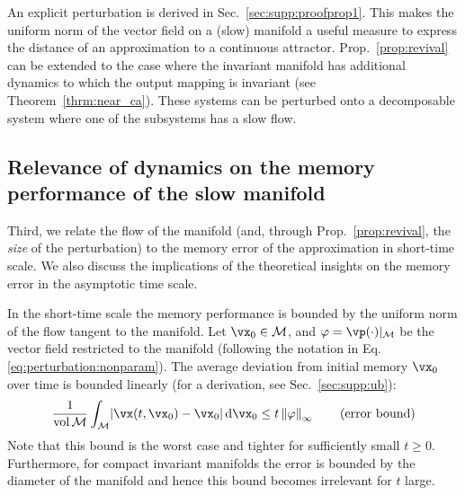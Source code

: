 \documentclass{article} %
\newcounter{ct}
\newcommand{\dm}[1]{\ensuremath{\mathrm{d}{#1}}} %
\newcommand{\manifold}{\mathcal{M}}
\newcommand{\uniformNorm}[1]{\left\|#1\right\|_\infty} %
\DeclarePairedDelimiter{\abs}{\lvert}{\rvert}
\theoremstyle{definition}
\theoremstyle{remark}
\begin{document}
\vspace{-.1cm}
An explicit perturbation is derived in Sec.~\ref{sec:supp:proofprop1}.
This makes the uniform norm of the vector field on a (slow) manifold a useful measure to express the distance of an approximation to a continuous attractor.
Prop.~\ref{prop:revival}  can be extended to the case where the invariant manifold has additional dynamics to which the output mapping is invariant (see Theorem~\ref{thrm:near_ca}).
These systems can be perturbed onto a decomposable system where one of the subsystems has a slow flow.

\subsection{Relevance of dynamics on the memory performance of the slow manifold}\label{sec:attractor_bif}

Third, we relate the flow of the manifold (and, through Prop.~\ref{prop:revival}, the \emph{size} of the perturbation) to the memory error of the approximation in short-time scale.
We also discuss the implications of the theoretical insights on the memory error in the asymptotic time scale.

In the short-time scale the memory performance is bounded by the uniform norm of the flow tangent to the manifold.
Let \(\vx_{0} \in \manifold\), and \(\varphi = \vp(\cdot)\vert_{\manifold}\) be the vector field restricted to the manifold (following the notation in Eq.\ref{eq:perturbation:nonparam}).
The average deviation from initial memory \(\vx_{0}\) over time is bounded linearly (for a derivation, see Sec.~\ref{sec:supp:ub}):
\begin{align}\label{eq:distance:ub}
\frac{1}{\operatorname{vol}\manifold}\int_{\manifold}
\abs{\vx(t, \vx_{0}) - \vx_{0}}\,
\dm{\vx_{0}}
\leq t\uniformNorm{\varphi}
\qquad
\text{(error bound)}
\end{align}
Note that this bound is the worst case and tighter for sufficiently small \(t \geq 0\).
Furthermore, for compact invariant manifolds the error is bounded by the diameter of the manifold and hence this bound becomes irrelevant for \(t\) large.
\end{document}
